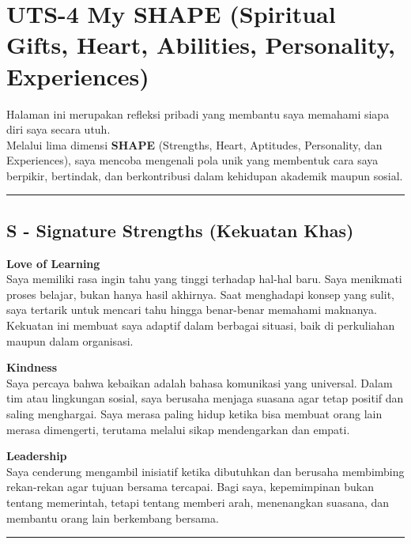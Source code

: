 \documentclass[
  letterpaper,
  DIV=11,
  numbers=noendperiod]{scrreprt}
\begin{document}

\chapter{UTS-4 My SHAPE (Spiritual Gifts, Heart, Abilities, Personality,
Experiences)}\label{uts-4-my-shape-spiritual-gifts-heart-abilities-personality-experiences}

Halaman ini merupakan refleksi pribadi yang membantu saya memahami siapa
diri saya secara utuh.\\
Melalui lima dimensi \textbf{SHAPE} (Strengths, Heart, Aptitudes,
Personality, dan Experiences), saya mencoba mengenali pola unik yang
membentuk cara saya berpikir, bertindak, dan berkontribusi dalam
kehidupan akademik maupun sosial.

\begin{center}\rule{0.5\linewidth}{0.5pt}\end{center}

\section{S - Signature Strengths (Kekuatan
Khas)}\label{s---signature-strengths-kekuatan-khas}

\textbf{Love of Learning}\\
Saya memiliki rasa ingin tahu yang tinggi terhadap hal-hal baru. Saya
menikmati proses belajar, bukan hanya hasil akhirnya. Saat menghadapi
konsep yang sulit, saya tertarik untuk mencari tahu hingga benar-benar
memahami maknanya. Kekuatan ini membuat saya adaptif dalam berbagai
situasi, baik di perkuliahan maupun dalam organisasi.

\textbf{Kindness}\\
Saya percaya bahwa kebaikan adalah bahasa komunikasi yang universal.
Dalam tim atau lingkungan sosial, saya berusaha menjaga suasana agar
tetap positif dan saling menghargai. Saya merasa paling hidup ketika
bisa membuat orang lain merasa dimengerti, terutama melalui sikap
mendengarkan dan empati.

\textbf{Leadership}\\
Saya cenderung mengambil inisiatif ketika dibutuhkan dan berusaha
membimbing rekan-rekan agar tujuan bersama tercapai. Bagi saya,
kepemimpinan bukan tentang memerintah, tetapi tentang memberi arah,
menenangkan suasana, dan membantu orang lain berkembang bersama.

\begin{center}\rule{0.5\linewidth}{0.5pt}\end{center}
\end{document}
